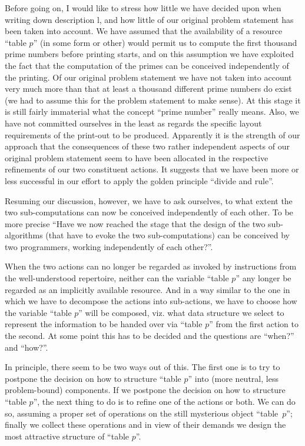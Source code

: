 \documentclass[twoside,11pt]{book}
\begin{document}
Before going on, I would like to stress how little we have decided upon when writing down description l, and how little of our original problem statement has been taken into account. We have assumed that the availability of a resource ``table $p$'' (in some form or other) would permit us to compute the first thousand prime numbers before printing starts, and on this assumption we have exploited the fact that the computation of the primes can be conceived independently of the printing. Of our original problem statement we have not taken into account very much more than that at least a thousand different prime numbers do exist (we had to assume this for the problem statement to make sense). At this stage it is still fairly immaterial what the concept ``prime number'' really means. Also, we have not committed ourselves in the least as regards the specific layout requirements of the print-out to be produced. Apparently it is the strength of our approach that the consequences of these two rather independent aspects of our original problem statement seem to have been allocated in the respective refinements of our two constituent actions. It suggests that we have been more or less successful in our effort to apply the golden principle ``divide and rule''.

Resuming our discussion, however, we have to ask ourselves, to what extent the two sub-computations can now be conceived independently of each other. To be more precise ``Have we now reached the stage that the design of the two sub-algorithms (that have to evoke the two sub-computations) can be conceived by two programmers, working independently of each other?''.

When the two actions can no longer be regarded as invoked by instructions from the well-understood repertoire, neither can the variable ``table $p$'' any longer be regarded as an implicitly available resource. And in a way similar to the one in which we have to decompose the actions into sub-actions, we have to choose how the variable ``table $p$'' will be composed, viz. what data structure we select to represent the information to be handed over via ``table $p$'' from the first action to the second. At some point this has to be decided and the questions are ``when?'' and ``how?''.

In principle, there seem to be two ways out of this. The first one is to try to postpone the decision on how to structure ``table $p$'' into (more neutral, less problem-bound) components. If we postpone the decision on how to structure ``table $p$'', the next thing to do is to refine one of the actions or both. We can do so, assuming a proper set of operations on the still mysterious object \mbox{``table $p$'';} finally we collect these operations and in view of their demands we design the most attractive structure of ``table $p$''.
\end{document}
